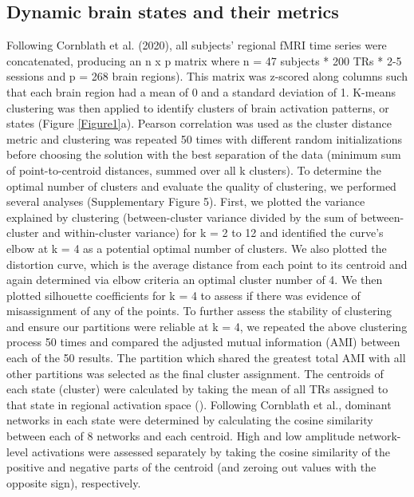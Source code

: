 \documentclass[phd,tocprelim]{cornell}
\begin{document}
	\subsection*{Dynamic brain states and their metrics}
	 Following Cornblath et al. (2020), all subjects’ regional fMRI time series were concatenated, producing an n x p matrix where n = 47 subjects * 200 TRs * 2-5 sessions and p = 268 brain regions). This matrix was z-scored along columns such that each brain region had a mean of 0 and a standard deviation of 1. K-means clustering was then applied to identify clusters of brain activation patterns, or states (Figure \ref{Figure1}a). Pearson correlation was used as the cluster distance metric and clustering was repeated 50 times with different random initializations before choosing the solution with the best separation of the data (minimum sum of point-to-centroid distances, summed over all k clusters). To determine the optimal number of clusters and evaluate the quality of clustering, we performed several analyses (Supplementary Figure 5). First, we plotted the variance explained by clustering (between-cluster variance divided by the sum of between-cluster and within-cluster variance) for k = 2 to 12 and identified the curve's elbow at k = 4 as a potential optimal number of clusters. We also plotted the distortion curve, which is the average distance from each point to its centroid and again determined via elbow criteria an optimal cluster number of 4. We then plotted silhouette coefficients for k = 4 to assess if there was evidence of misassignment of any of the points. To further assess the stability of clustering and ensure our partitions were reliable at k = 4, we repeated the above clustering process 50 times and compared the adjusted mutual information (AMI) between each of the 50 results. The partition which shared the greatest total AMI with all other partitions was selected as the final cluster assignment. The centroids of each state (cluster) were calculated by taking the mean of all TRs assigned to that state in regional activation space (\cite{Cornblath2020-nc}). Following Cornblath et al., dominant networks in each state were determined by calculating the cosine similarity between each of 8  networks and each centroid. High and low amplitude network-level activations were assessed separately by taking the cosine similarity of the positive and negative parts of the centroid (and zeroing out values with the opposite sign), respectively. 
	 
\end{document}
